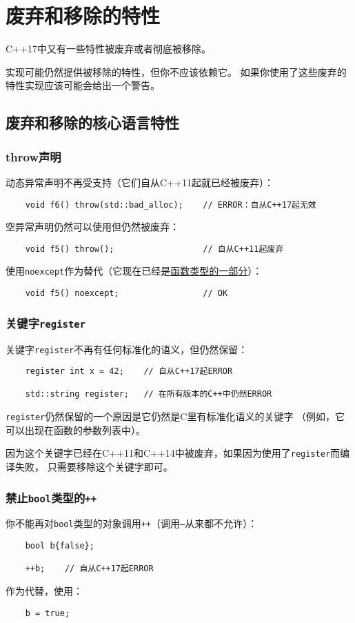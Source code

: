 \chapter{废弃和移除的特性}\label{ch35}
C++17中又有一些特性被废弃或者彻底被移除。

实现可能仍然提供被移除的特性，但你不应该依赖它。
如果你使用了这些废弃的特性实现应该可能会给出一个警告。


\section{废弃和移除的核心语言特性}

\subsection{throw声明}
动态异常声明不再受支持（它们自从C++11起就已经被废弃）：
\begin{lstlisting}
    void f6() throw(std::bad_alloc);    // ERROR：自从C++17起无效
\end{lstlisting}
空异常声明仍然可以使用但仍然被废弃：
\begin{lstlisting}
    void f5() throw();                  // 自从C++11起废弃
\end{lstlisting}
使用\texttt{noexcept}作为替代（它现在已经是\hyperref[ch8.7]{函数类型的一部分}）：
\begin{lstlisting}
    void f5() noexcept;                 // OK
\end{lstlisting}

\subsection{关键字\texttt{register}}
关键字\texttt{register}不再有任何标准化的语义，但仍然保留：
\begin{lstlisting}
    register int x = 42;    // 自从C++17起ERROR

    std::string register;   // 在所有版本的C++中仍然ERROR
\end{lstlisting}
\texttt{register}仍然保留的一个原因是它仍然是C里有标准化语义的关键字
（例如，它可以出现在函数的参数列表中）。

因为这个关键字已经在C++11和C++14中被废弃，如果因为使用了\texttt{register}而编译失败，
只需要移除这个关键字即可。

\subsection{禁止\texttt{bool}类型的\texttt{++}}
你不能再对\texttt{bool}类型的对象调用\texttt{++}（调用\texttt{--}从来都不允许）：
\begin{lstlisting}
    bool b{false};

    ++b;    // 自从C++17起ERROR
\end{lstlisting}
作为代替，使用：
\begin{lstlisting}
    b = true;
\end{lstlisting}

